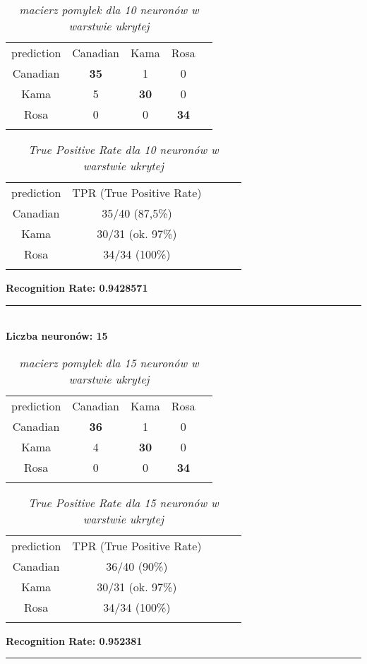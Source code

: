 \documentclass[a4paper,12pt]{article}
\newcommand{\linia}{\rule{\linewidth}{0.5pt}}
\theoremstyle{mytheor}
\begin{document}
\begin{table}[H]
\begin{tabular}{ccccc}
prediction & Canadian & Kama & Rosa  &  \\
Canadian & \textbf{35} & 1 & 0 &  \\
Kama & 5 & \textbf{30} & 0 &  \\
Rosa & 0 & 0 & \textbf{34} &  \\
&&&& 
\end{tabular}
\caption{\textit{macierz pomyłek dla 10 neuronów w warstwie ukrytej}}
\label{tab:3}
\end{table}
\begin{table}[H]
\begin{tabular}{ccccc}
prediction & TPR (True Positive Rate) &  \\
Canadian & 35/40 (87,5\%) & \\
Kama & 30/31 (ok. 97\%) & \\
Rosa & 34/34 (100\%) & \\
&&
\end{tabular}
\caption{\textit{True Positive Rate dla 10 neuronów w warstwie ukrytej}}
\label{tab:4}
\end{table}
\textbf{Recognition Rate: 0.9428571}\\
\linia\\

\textbf{Liczba neuronów: 15}\\

\begin{table}[H]
\begin{tabular}{ccccc}
prediction & Canadian & Kama & Rosa  &  \\
Canadian & \textbf{36} & 1 & 0 &  \\
Kama & 4 & \textbf{30} & 0 &  \\
Rosa & 0 & 0 & \textbf{34} &  \\
&&&& 
\end{tabular}
\caption{\textit{macierz pomyłek dla 15 neuronów w warstwie ukrytej}}
\label{tab:5}
\end{table}
\begin{table}[H]
\begin{tabular}{ccccc}
prediction & TPR (True Positive Rate) &  \\
Canadian & 36/40 (90\%) & \\
Kama & 30/31 (ok. 97\%) & \\
Rosa & 34/34 (100\%) & \\
&&
\end{tabular}
\caption{\textit{True Positive Rate dla 15 neuronów w warstwie ukrytej}}
\label{tab:6}
\end{table}
\textbf{Recognition Rate: 0.952381}\\
\linia\\
\end{document}
